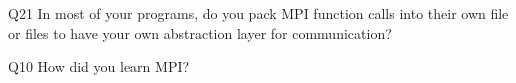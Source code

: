 \begin{description}%
\item{Q21} In most of your programs, do you pack MPI function calls into their own file or files to have your own abstraction layer for communication?%
\item{Q10} How did you learn MPI?%
\end{description}%
